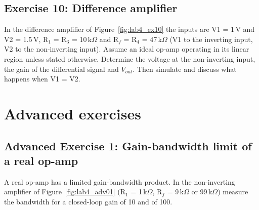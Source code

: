 

\subsection{Exercise 10: Difference amplifier}
In the difference amplifier of Figure~\ref{fig:lab4_ex10} the inputs are V1 = 1\,V and V2 = 1.5\,V, R$_1$ = R$_3$ = 10\,k$\Omega$ and R$_f$ = R$_4$ = 47\,k$\Omega$ (V1 to the inverting input, V2 to the non-inverting input). Assume an ideal op-amp operating in its linear region unless stated otherwise. Determine the voltage at the non-inverting input, the gain of the differential signal and $V_{out}$. Then simulate and discuss what happens when V1 = V2.






\newpage
\section{Advanced exercises}

\subsection{Advanced Exercise 1: Gain-bandwidth limit of a real op-amp}
A real op-amp has a limited gain-bandwidth product. In the non-inverting amplifier of Figure~\ref{fig:lab4_adv01} (R$_1$ = 1\,k$\Omega$, R$_f$ = 9\,k$\Omega$ or 99\,k$\Omega$) measure the bandwidth for a closed-loop gain of 10 and of 100.


